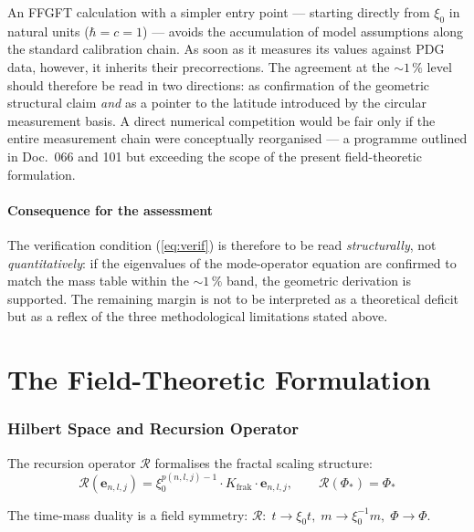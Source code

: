 An FFGFT calculation with a simpler entry point --- starting directly
from $\xi_0$ in natural units ($\hbar = c = 1$) --- avoids the
accumulation of model assumptions along the standard calibration
chain. As soon as it measures its values against PDG data, however,
it inherits their precorrections. The agreement at the $\sim 1\,\%$
level should therefore be read in two directions: as confirmation of
the geometric structural claim \emph{and} as a pointer to the
latitude introduced by the circular measurement basis. A direct
numerical competition would be fair only if the entire measurement
chain were conceptually reorganised --- a programme outlined in
Doc.~066 and 101 but exceeding the scope of the present field-theoretic
formulation.

\subsection*{Consequence for the assessment}

The verification condition (\ref{eq:verif}) is therefore to be read
\emph{structurally}, not \emph{quantitatively}: if the eigenvalues
of the mode-operator equation are confirmed to match the mass table
within the $\sim 1\,\%$ band, the geometric derivation is supported.
The remaining margin is not to be interpreted as a theoretical deficit
but as a reflex of the three methodological limitations stated above.

\part{The Field-Theoretic Formulation}

\section{Hilbert Space and Recursion Operator}

The recursion operator $\mathcal{R}$ formalises the fractal scaling structure:
\begin{equation}
  \mathcal{R}(\mathbf{e}_{n,l,j})
  = \xi_0^{p(n,l,j)-1} \cdot K_{\text{frak}} \cdot \mathbf{e}_{n,l,j},
  \qquad \mathcal{R}(\Phi_*) = \Phi_*
\end{equation}

The time-mass duality is a field symmetry:
$\mathcal{R}:\; t \to \xi_0 t,\; m \to \xi_0^{-1} m,\; \Phi \to \Phi$.

